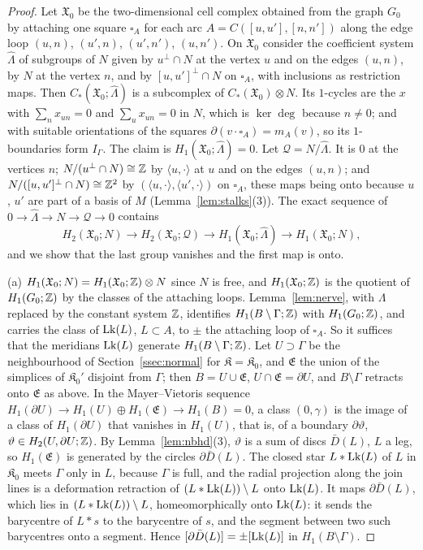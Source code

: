 \begin{proof}
Let $\mathfrak X_0$ be the two-dimensional cell complex obtained from the graph $G_0$ by attaching one square $\square_A$ for each arc
$A=C([u,u'],[n,n'])$ along the edge loop $(u,n)$, $(u',n)$, $(u',n')$, $(u,n')$. On $\mathfrak X_0$ consider the coefficient system $\hat\Lambda$
of subgroups of $N$ given by $u^\perp\cap N$ at the vertex $u$ and on the edges $(u,n)$, by $N$ at the vertex $n$, and by
$[u,u']^\perp\cap N$ on $\square_A$, with inclusions as restriction maps. Then $C_*(\mathfrak X_0;\hat\Lambda)$ is a subcomplex of
$C_*(\mathfrak X_0)\otimes N$. Its $1$-cycles are the $x$ with $\sum_nx_{un}=0$ and $\sum_ux_{un}=0$ in $N$, which is $\ker\deg$ because
$n\ne0$; and with suitable orientations of the squares $\partial(v\cdot \square_A)=m_A(v)$, so its $1$-boundaries form $I_\Gamma$. The
claim is $H_1(\mathfrak X_0;\hat\Lambda)=0$. Let $\mathcal Q=N/\hat\Lambda$. It is $0$ at the vertices $n$; $N/(u^\perp\cap N)\cong\mathbb Z$ by
$\langle u,\cdot\rangle$ at $u$ and on the edges $(u,n)$; and $N/([u,u']^\perp\cap N)\cong\mathbb Z^2$ by $(\langle u,\cdot\rangle,
\langle u',\cdot\rangle)$ on $\square_A$, these maps being onto because $u$, $u'$ are part of a basis of $M$
(Lemma~\ref{lem:stalks}(3)). The exact sequence of $0\to\hat\Lambda\to N\to\mathcal Q\to0$ contains
\[
H_2(\mathfrak X_0;N)\to H_2(\mathfrak X_0;\mathcal Q)\to H_1(\mathfrak X_0;\hat\Lambda)\to H_1(\mathfrak X_0;N),
\]
and we show that the last group vanishes and the first map is onto.

(a) $H_1(\mathfrak X_0;N)=H_1(\mathfrak X_0;\mathbb Z)\otimes N$ since $N$ is free, and $H_1(\mathfrak X_0;\mathbb Z)$ is the quotient of $H_1(G_0;\mathbb Z)$ by the classes of
the attaching loops. Lemma~\ref{lem:nerve}, with $\Lambda$ replaced by the constant system $\mathbb Z$, identifies
$H_1(B\setminus\Gamma;\mathbb Z)$ with $H_1(G_0;\mathbb Z)$, and carries the class of $\operatorname{Lk}(L)$, $L\subset A$, to $\pm$ the attaching loop of
$\square_A$. So it suffices that the meridians $\operatorname{Lk}(L)$ generate $H_1(B\setminus\Gamma;\mathbb Z)$. Let $U\supset\Gamma$ be the
neighbourhood of Section~\ref{ssec:normal} for $\mathfrak K=\mathfrak K_0$, and $\mathfrak E$ the union of the simplices of
$\mathfrak K_0'$ disjoint from $\Gamma$; then $B=U\cup \mathfrak E$, $U\cap \mathfrak E=\partial U$, and $B\setminus\Gamma$ retracts onto $\mathfrak E$ as
above. In the Mayer--Vietoris sequence $H_1(\partial U)\to H_1(U)\oplus H_1(\mathfrak E)\to H_1(B)=0$, a class $(0,\gamma)$ is the image
of a class of $H_1(\partial U)$ that vanishes in $H_1(U)$, that is, of a boundary $\partial\vartheta$, $\vartheta\in H_2(U,\partial U;\mathbb Z)$.
By Lemma~\ref{lem:nbhd}(3), $\vartheta$ is a sum of discs $\bar D(L)$, $L$ a leg, so $H_1(\mathfrak E)$ is generated by the circles
$\partial\bar D(L)$. The closed star $L*\operatorname{Lk}(L)$ of $L$ in $\mathfrak K_0$ meets $\Gamma$ only in $L$, because $\Gamma$ is full,
and the radial projection along the join lines is a deformation retraction of $(L*\operatorname{Lk}(L))\setminus L$ onto $\operatorname{Lk}(L)$. It maps
$\partial\bar D(L)$, which lies in $(L*\operatorname{Lk}(L))\setminus L$, homeomorphically onto $\operatorname{Lk}(L)$: it sends the barycentre of $L*s$ to
the barycentre of $s$, and the segment between two such barycentres onto a segment. Hence $[\partial\bar D(L)]=\pm[\operatorname{Lk}(L)]$ in
$H_1(B\setminus\Gamma)$.


\end{proof}
